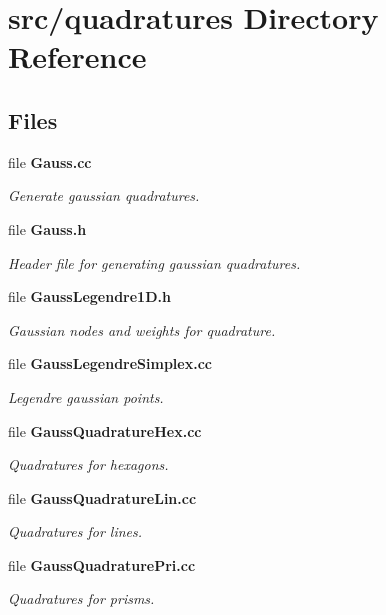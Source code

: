 \section{src/quadratures Directory Reference}
\label{dir_eb9b59aa71bec2c666fd515be3668a7e}
\subsection*{Files}
\begin{DoxyCompactItemize}
\item 
file {\bf Gauss.\-cc}
\begin{DoxyCompactList}\small\item\em Generate gaussian quadratures. \end{DoxyCompactList}\item 
file {\bf Gauss.\-h}
\begin{DoxyCompactList}\small\item\em Header file for generating gaussian quadratures. \end{DoxyCompactList}\item 
file {\bf Gauss\-Legendre1\-D.\-h}
\begin{DoxyCompactList}\small\item\em Gaussian nodes and weights for quadrature. \end{DoxyCompactList}\item 
file {\bf Gauss\-Legendre\-Simplex.\-cc}
\begin{DoxyCompactList}\small\item\em Legendre gaussian points. \end{DoxyCompactList}\item 
file {\bf Gauss\-Quadrature\-Hex.\-cc}
\begin{DoxyCompactList}\small\item\em Quadratures for hexagons. \end{DoxyCompactList}\item 
file {\bf Gauss\-Quadrature\-Lin.\-cc}
\begin{DoxyCompactList}\small\item\em Quadratures for lines. \end{DoxyCompactList}\item 
file {\bf Gauss\-Quadrature\-Pri.\-cc}
\begin{DoxyCompactList}\small\item\em Quadratures for prisms. \end{DoxyCompactList}\item 

\end{DoxyCompactItemize}

